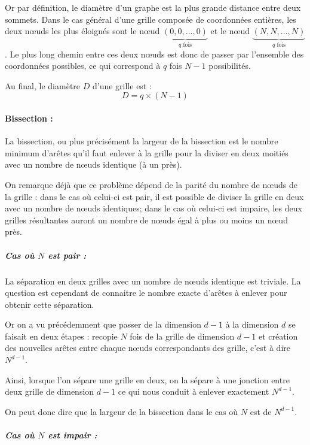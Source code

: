 Or par définition, le diamètre d'un graphe est la plus grande distance entre deux sommets. Dans le cas général d'une grille composée de coordonnées entières, les deux nœuds les plus éloignés sont le nœud $\underbrace{(0,0,...,0)}_{q \text{ fois}}$ et le nœud $\underbrace{(N,N,...,N)}_{q \text{ fois}}$. Le plus long chemin entre ces deux nœuds est donc de passer par l'ensemble des coordonnées possibles, ce qui correspond à $q$ fois $N-1$ possibilités.

Au final, le diamètre $D$ d'une grille est : $$D = q\times(N-1)$$

\paragraph{Bissection :}

La bissection, ou plus précisément la largeur de la bissection est le nombre minimum d'arêtes qu'il faut enlever à la grille pour la diviser en deux moitiés avec un nombre de nœuds identique (à un près).

On remarque déjà que ce problème dépend de la parité du nombre de nœuds de la grille : dans le cas où celui-ci est pair, il est possible de diviser la grille en deux avec un nombre de nœuds identiques; dans le cas où celui-ci est impaire, les deux grilles résultantes auront un nombre de nœuds égal à plus ou moins un nœud près.

\subparagraph{Cas où $N$ est pair :}

La séparation en deux grilles avec un nombre de nœuds identique est triviale. La question est cependant de connaitre le nombre exacte d'arêtes à enlever pour obtenir cette séparation.

Or on a vu précédemment que passer de la dimension $d-1$ à la dimension $d$ se faisait en deux étapes : recopie $N$ fois de la grille de dimension $d-1$ et création des nouvelles arêtes entre chaque nœuds correspondants des grille, c'est à dire $N^{d-1}$.

Ainsi, lorsque l'on sépare une grille en deux, on la sépare à une jonction entre deux grille de dimension $d-1$ ce qui nous conduit à enlever exactement $N^{d-1}$.

On peut donc dire que la largeur de la bissection dans le cas où $N$ est de $N^{d-1}$.

\subparagraph{Cas où $N$ est impair :}



